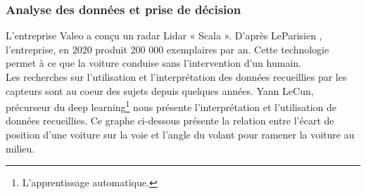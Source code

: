 \subsubsection{Analyse des données et prise de décision}
L'entreprise Valeo a conçu un radar Lidar « Scala ». D'après LeParisien \cite{le_parisien_radar_2019}, l'entreprise, en 2020 produit 200 000 exemplaires par an. Cette technologie permet à ce que la voiture conduise sans l'intervention d'un humain.\\
Les recherches sur l'utilisation et l'interprétation des données recueillies par les capteurs sont au coeur des sujets depuis quelques années. Yann LeCun, précurseur du deep learning\footnote{L'apprentissage automatique.} nous présente l'interprétation et l'utilisation de données recueillies.
Ce graphe ci-dessous présente la relation entre l’écart de position d’une voiture sur la voie et l’angle du volant pour ramener la voiture au milieu. 

